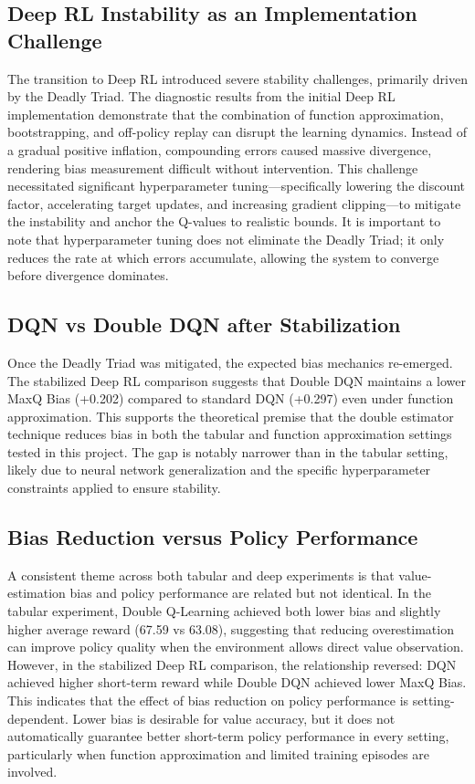 \documentclass[11pt,a4paper]{article}
\begin{document}
\subsection{Deep RL Instability as an Implementation Challenge}
The transition to Deep RL introduced severe stability challenges, primarily driven by the Deadly Triad. The diagnostic results from the initial Deep RL implementation demonstrate that the combination of function approximation, bootstrapping, and off-policy replay can disrupt the learning dynamics. Instead of a gradual positive inflation, compounding errors caused massive divergence, rendering bias measurement difficult without intervention. This challenge necessitated significant hyperparameter tuning—specifically lowering the discount factor, accelerating target updates, and increasing gradient clipping—to mitigate the instability and anchor the Q-values to realistic bounds. It is important to note that hyperparameter tuning does not eliminate the Deadly Triad; it only reduces the rate at which errors accumulate, allowing the system to converge before divergence dominates.

\subsection{DQN vs Double DQN after Stabilization}
Once the Deadly Triad was mitigated, the expected bias mechanics re-emerged. The stabilized Deep RL comparison suggests that Double DQN maintains a lower MaxQ Bias (+0.202) compared to standard DQN (+0.297) even under function approximation. This supports the theoretical premise that the double estimator technique reduces bias in both the tabular and function approximation settings tested in this project. The gap is notably narrower than in the tabular setting, likely due to neural network generalization and the specific hyperparameter constraints applied to ensure stability.

\subsection{Bias Reduction versus Policy Performance}
A consistent theme across both tabular and deep experiments is that value-estimation bias and policy performance are related but not identical. In the tabular experiment, Double Q-Learning achieved both lower bias and slightly higher average reward (67.59 vs 63.08), suggesting that reducing overestimation can improve policy quality when the environment allows direct value observation. However, in the stabilized Deep RL comparison, the relationship reversed: DQN achieved higher short-term reward while Double DQN achieved lower MaxQ Bias. This indicates that the effect of bias reduction on policy performance is setting-dependent. Lower bias is desirable for value accuracy, but it does not automatically guarantee better short-term policy performance in every setting, particularly when function approximation and limited training episodes are involved.
\end{document}
